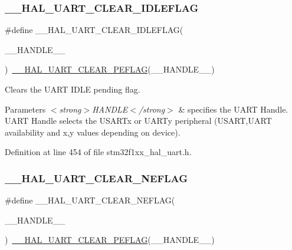 \subsubsection{\texorpdfstring{\+\_\+\+\_\+\+H\+A\+L\+\_\+\+U\+A\+R\+T\+\_\+\+C\+L\+E\+A\+R\+\_\+\+I\+D\+L\+E\+F\+L\+AG}{\_\_HAL\_UART\_CLEAR\_IDLEFLAG}}
{\footnotesize\ttfamily \#define \+\_\+\+\_\+\+H\+A\+L\+\_\+\+U\+A\+R\+T\+\_\+\+C\+L\+E\+A\+R\+\_\+\+I\+D\+L\+E\+F\+L\+AG(\begin{DoxyParamCaption}\item[{}]{\+\_\+\+\_\+\+H\+A\+N\+D\+L\+E\+\_\+\+\_\+ }\end{DoxyParamCaption})~\hyperlink{group___u_a_r_t___exported___macros_gaba5e19c60e0f37341b1585a380b84d49}{\+\_\+\+\_\+\+H\+A\+L\+\_\+\+U\+A\+R\+T\+\_\+\+C\+L\+E\+A\+R\+\_\+\+P\+E\+F\+L\+AG}(\+\_\+\+\_\+\+H\+A\+N\+D\+L\+E\+\_\+\+\_\+)}



Clears the U\+A\+RT I\+D\+LE pending flag. 


\begin{DoxyParams}{Parameters}
{\em $<$strong$>$\+H\+A\+N\+D\+L\+E$<$/strong$>$} & specifies the U\+A\+RT Handle. U\+A\+RT Handle selects the U\+S\+A\+R\+Tx or U\+A\+R\+Ty peripheral (U\+S\+A\+RT,U\+A\+RT availability and x,y values depending on device). \\
\hline
\end{DoxyParams}


Definition at line 454 of file stm32f1xx\+\_\+hal\+\_\+uart.\+h.

\mbox{\label{group___u_a_r_t___exported___macros_gaa1f69421585b3ada4d2b81d502a3ae6b}} 
\subsubsection{\texorpdfstring{\+\_\+\+\_\+\+H\+A\+L\+\_\+\+U\+A\+R\+T\+\_\+\+C\+L\+E\+A\+R\+\_\+\+N\+E\+F\+L\+AG}{\_\_HAL\_UART\_CLEAR\_NEFLAG}}
{\footnotesize\ttfamily \#define \+\_\+\+\_\+\+H\+A\+L\+\_\+\+U\+A\+R\+T\+\_\+\+C\+L\+E\+A\+R\+\_\+\+N\+E\+F\+L\+AG(\begin{DoxyParamCaption}\item[{}]{\+\_\+\+\_\+\+H\+A\+N\+D\+L\+E\+\_\+\+\_\+ }\end{DoxyParamCaption})~\hyperlink{group___u_a_r_t___exported___macros_gaba5e19c60e0f37341b1585a380b84d49}{\+\_\+\+\_\+\+H\+A\+L\+\_\+\+U\+A\+R\+T\+\_\+\+C\+L\+E\+A\+R\+\_\+\+P\+E\+F\+L\+AG}(\+\_\+\+\_\+\+H\+A\+N\+D\+L\+E\+\_\+\+\_\+)}



